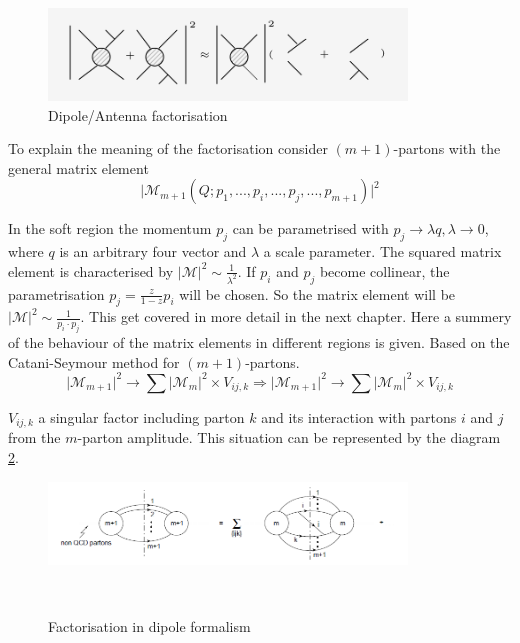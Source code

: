 \begin{figure}[h!]
\centering
\includegraphics[width=0.85\textwidth]{images/Intro/factorization.png}
\caption{Dipole/Antenna factorisation}
\label{Dipole}
\end{figure}
To explain the meaning of the factorisation consider $(m+1)$-partons with the general matrix element~\cite{Seymour:1994we, Catani:2002hc}
\begin{equation}
\vert {{\mathcal{M}}}_{m+1} (Q; p_1,...,p_i,...,p_j,...,p_{m+1}) \vert^2
\end{equation}

In the soft region the momentum $ p_j $ can be parametrised with $ p_j \rightarrow \lambda q, \lambda \rightarrow 0 $, where $ q $ is an arbitrary four vector and $ \lambda $ a scale parameter. 
The squared matrix element is characterised by $ \vert {{\mathcal{M}}} \vert^2 \sim \frac{1}{\lambda^2}$. If $ p_i $ and $ p_j $ become collinear, the parametrisation $ p_j = \frac{z}{1-z} p_i $ will be chosen. So the matrix element will be $ \vert {{\mathcal{M}}} \vert^2 \sim \frac{1}{p_i \cdot p_j}$.
This get covered in more detail in the next chapter. Here a summery of the behaviour of the matrix elements in different regions is given.
Based on the Catani-Seymour method for $(m+1)$-partons. 
\begin{equation}
\vert {{\mathcal{M}}}_{m+1}  \vert^2 \rightarrow \sum \vert {{\mathcal{M}}}_{m}  \vert^2 \times V_{ij,k}
\Rightarrow \vert {{\mathcal{M}}}_{m+1}  \vert^2 \rightarrow \sum \vert {{\mathcal{M}}}_{m}  \vert^2 \times V_{ij,k}
\end{equation}

$ V_{ij,k} $ a singular factor including parton $k$ and its interaction with partons $i$ and $j$ from the $m$-parton amplitude. This situation can be represented by the diagram \ref{factorisationPic}.

\begin{figure}[h!]
\centering
\includegraphics[width=0.85\textwidth]{images/Intro/factorisationPic.png}
\caption{Factorisation in dipole formalism}
\label{factorisationPic}
~\cite{Catani:1996vz}
\end{figure}

